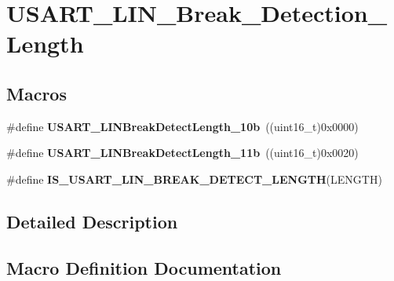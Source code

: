 \hypertarget{group___u_s_a_r_t___l_i_n___break___detection___length}{}\section{U\+S\+A\+R\+T\+\_\+\+L\+I\+N\+\_\+\+Break\+\_\+\+Detection\+\_\+\+Length}
\label{group___u_s_a_r_t___l_i_n___break___detection___length}
\subsection*{Macros}
\begin{DoxyCompactItemize}
\item 
\hypertarget{group___u_s_a_r_t___l_i_n___break___detection___length_gacfd0aabae8774239440e828c961ac2a0}{}\#define {\bfseries U\+S\+A\+R\+T\+\_\+\+L\+I\+N\+Break\+Detect\+Length\+\_\+10b}~((uint16\+\_\+t)0x0000)\label{group___u_s_a_r_t___l_i_n___break___detection___length_gacfd0aabae8774239440e828c961ac2a0}

\item 
\hypertarget{group___u_s_a_r_t___l_i_n___break___detection___length_gaf591cfcc859d67d71e6fa594eb5aec16}{}\#define {\bfseries U\+S\+A\+R\+T\+\_\+\+L\+I\+N\+Break\+Detect\+Length\+\_\+11b}~((uint16\+\_\+t)0x0020)\label{group___u_s_a_r_t___l_i_n___break___detection___length_gaf591cfcc859d67d71e6fa594eb5aec16}

\item 
\#define {\bfseries I\+S\+\_\+\+U\+S\+A\+R\+T\+\_\+\+L\+I\+N\+\_\+\+B\+R\+E\+A\+K\+\_\+\+D\+E\+T\+E\+C\+T\+\_\+\+L\+E\+N\+G\+T\+H}(L\+E\+N\+G\+T\+H)
\end{DoxyCompactItemize}


\subsection{Detailed Description}


\subsection{Macro Definition Documentation}
\hypertarget{group___u_s_a_r_t___l_i_n___break___detection___length_gaa7a45d542b1df5da1160777ad4a80d72}{}
